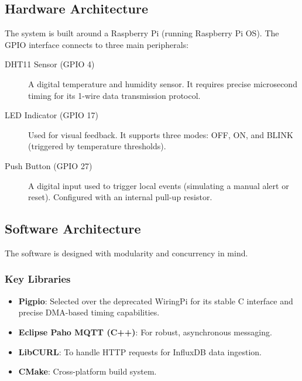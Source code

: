 \documentclass[12pt, a4paper]{article}
\begin{document}
\subsection{Hardware Architecture}
The system is built around a Raspberry Pi (running Raspberry Pi OS). The GPIO interface connects to three main peripherals:

\begin{description}
    \item[DHT11 Sensor (GPIO 4)] A digital temperature and humidity sensor. It requires precise microsecond timing for its 1-wire data transmission protocol.
    \item[LED Indicator (GPIO 17)] Used for visual feedback. It supports three modes: OFF, ON, and BLINK (triggered by temperature thresholds).
    \item[Push Button (GPIO 27)] A digital input used to trigger local events (simulating a manual alert or reset). Configured with an internal pull-up resistor.
\end{description}

\subsection{Software Architecture}
The software is designed with modularity and concurrency in mind.

\subsubsection{Key Libraries}
\begin{itemize}
    \item \textbf{Pigpio}: Selected over the deprecated WiringPi for its stable C interface and precise DMA-based timing capabilities.
    \item \textbf{Eclipse Paho MQTT (C++)}: For robust, asynchronous messaging.
    \item \textbf{LibCURL}: To handle HTTP requests for InfluxDB data ingestion.
    \item \textbf{CMake}: Cross-platform build system.
\end{itemize}
\end{document}
